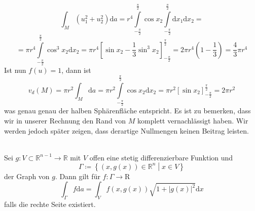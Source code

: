 \begin{beispiel}
\begin{equation*}
	\int_M(u_1^2+u_2^2)\mathrm{d}a=r^4\int\limits_{-\frac{\pi}{2}}^{\frac{\pi}{2}}\cos x_2 \int\limits_{-\frac{\pi}{2}}^{\frac{\pi}{2}}\mathrm{d}x_1\mathrm{d}x_2 =
\end{equation*}
\begin{equation*}
	= \pi r^4 \int\limits_{-\frac{\pi}{2}}^{\frac{\pi}{2}} \cos^3 x_2\mathrm{d}x_2 = \pi r^4 \left[\sin x_2-\frac{1}{3}\sin^3 x_2\right]_{-\frac{\pi}{2}}^{\frac{\pi}{2}} = 
	2\pi r^4\left(1-\frac{1}{3}\right)=\frac{4}{3}\pi r^4
\end{equation*}
Ist nun $f(u)=1$, dann ist
\begin{equation*}
	v_d(M)=\pi r^2 \int_M\mathrm{d}a=\pi r^2 \int\limits_{-\frac{\pi}{2}}^{\frac{\pi}{2}} \cos x_2 \mathrm{d}x_2 = 
	\pi r^2 \left[\sin x_2\right]_{-\frac{\pi}{2}}^{\frac{\pi}{2}} = 2 \pi r^2
\end{equation*}
was genau genau der halben Sphärenfläche entspricht. 
Es ist zu bemerken, dass wir in unserer Rechnung den Rand von $M$ komplett vernachlässigt haben. 
Wir werden jedoch später zeigen, dass derartige Nullmengen keinen Beitrag leisten. 
\end{beispiel}

\begin{satz}
\ \\ Sei $g:V\subset\mathbb{R}^{n-1}\rightarrow\mathbb{R}$ mit $V$ offen eine stetig differenzierbare Funktion und 
\begin{equation*}
	\Gamma\coloneqq\left\{\left(x,g(x)\right)\in\mathbb{R}^n \middle| x\in V \right\}
\end{equation*}
der Graph von $g$. Dann gilt für $f:\Gamma\rightarrow\mathrm{R}$
\begin{equation}
\int_\Gamma f\mathrm{d}a=\int_Vf\left(x,g(x)\right)\sqrt{1+|g(x)|^2}\mathrm{d}x
\end{equation}
falls die rechte Seite existiert.
\end{satz}


